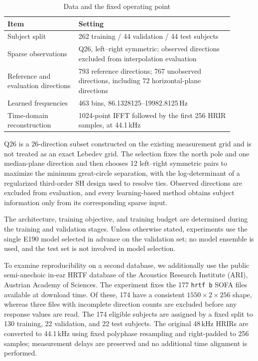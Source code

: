 \documentclass[UTF8,a4paper]{article}
\begin{document}
\begin{table}[htbp]
\centering\small
\caption{Data and the fixed operating point}
\label{tab:protocol}
\begin{tabular}{p{0.29\linewidth}p{0.61\linewidth}}
\toprule
Item & Setting\\
\midrule
Subject split & 262 training / 44 validation / 44 test subjects\\
Sparse observations & Q26, left--right symmetric; observed directions excluded from interpolation evaluation\\
Reference and evaluation directions & 793 reference directions; 767 unobserved directions, including 72 horizontal-plane directions\\
Learned frequencies & 463 bins, 86.1328125--19982.8125\,Hz\\
Time-domain reconstruction & 1024-point IFFT followed by the first 256 HRIR samples, at 44.1\,kHz\\
\bottomrule
\end{tabular}
\end{table}

Q26 is a 26-direction subset constructed on the existing measurement grid and is not treated as an exact Lebedev grid. The selection fixes the north pole and one median-plane direction and then chooses 12 left--right symmetric pairs to maximize the minimum great-circle separation, with the log-determinant of a regularized third-order SH design used to resolve ties. Observed directions are excluded from evaluation, and every learning-based method obtains subject information only from its corresponding sparse input.

The architecture, training objective, and training budget are determined during the training and validation stages. Unless otherwise stated, experiments use the single E190 model selected in advance on the validation set; no model ensemble is used, and the test set is not involved in model selection.

To examine reproducibility on a second database, we additionally use the public semi-anechoic in-ear HRTF database of the Acoustics Research Institute (ARI), Austrian Academy of Sciences\cite{R20}. The experiment fixes the 177 \texttt{hrtf b} SOFA files available at download time. Of these, 174 have a consistent $1550\times2\times256$ shape, whereas three files with incomplete direction counts are excluded before any response values are read. The 174 eligible subjects are assigned by a fixed split to 130 training, 22 validation, and 22 test subjects. The original 48\,kHz HRIRs are converted to 44.1\,kHz using fixed polyphase resampling and right-padded to 256 samples; measurement delays are preserved and no additional time alignment is performed.
\end{document}
